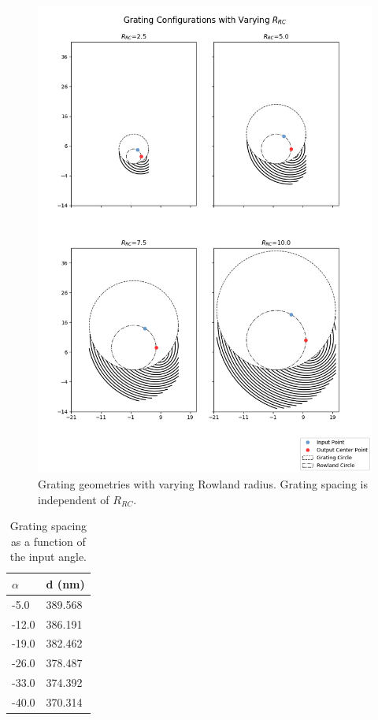\documentclass{article}
\begin{document}
    \begin{figure}[H]        
    \centering
    \scriptsize 
    \includegraphics[width=0.9 \textwidth]{images/vary_r.png}
    \caption{\label{fig:vary_R} Grating geometries with varying Rowland radius. Grating spacing is independent of $R_{RC}$.}
    \end{figure}
    
     \begin{table}[H]
    \centering
    \caption{Grating spacing as a function of the input angle.}
    \label{tab:d_vs_alpha}
    \begin{tabular}{|l|l|}
    \hline
    $\alpha$ & d (nm)  \\ \hline
    -5.0     & 389.568 \\ \hline
    -12.0    & 386.191 \\ \hline
    -19.0    & 382.462 \\ \hline
    -26.0    & 378.487 \\ \hline
    -33.0    & 374.392 \\ \hline
    -40.0    & 370.314 \\ \hline
    \end{tabular}
    \end{table}
    
\end{document}
